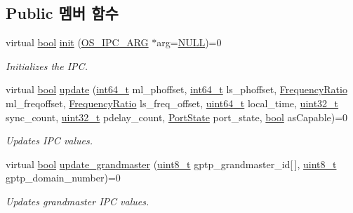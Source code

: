 \subsection*{Public 멤버 함수}
\begin{DoxyCompactItemize}
\item 
virtual \hyperlink{avb__gptp_8h_af6a258d8f3ee5206d682d799316314b1}{bool} \hyperlink{class_o_s___i_p_c_af0461840a5fc47851aa77477baf10f6b}{init} (\hyperlink{class_o_s___i_p_c___a_r_g}{O\+S\+\_\+\+I\+P\+C\+\_\+\+A\+RG} $\ast$arg=\hyperlink{openavb__types__base__pub_8h_a070d2ce7b6bb7e5c05602aa8c308d0c4}{N\+U\+LL})=0
\begin{DoxyCompactList}\small\item\em Initializes the I\+PC. \end{DoxyCompactList}\item 
virtual \hyperlink{avb__gptp_8h_af6a258d8f3ee5206d682d799316314b1}{bool} \hyperlink{class_o_s___i_p_c_a33745dd660255c4161278e3bf75387dc}{update} (\hyperlink{parse_8c_a67a9885ef4908cb72ce26d75b694386c}{int64\+\_\+t} ml\+\_\+phoffset, \hyperlink{parse_8c_a67a9885ef4908cb72ce26d75b694386c}{int64\+\_\+t} ls\+\_\+phoffset, \hyperlink{ptptypes_8hpp_a84de47dc2ed889ecd2b61706d3ad0f2e}{Frequency\+Ratio} ml\+\_\+freqoffset, \hyperlink{ptptypes_8hpp_a84de47dc2ed889ecd2b61706d3ad0f2e}{Frequency\+Ratio} ls\+\_\+freq\+\_\+offset, \hyperlink{parse_8c_aec6fcb673ff035718c238c8c9d544c47}{uint64\+\_\+t} local\+\_\+time, \hyperlink{parse_8c_a6eb1e68cc391dd753bc8ce896dbb8315}{uint32\+\_\+t} sync\+\_\+count, \hyperlink{parse_8c_a6eb1e68cc391dd753bc8ce896dbb8315}{uint32\+\_\+t} pdelay\+\_\+count, \hyperlink{ptptypes_8hpp_a679431f1afc75d7bb9e972c022e53672}{Port\+State} port\+\_\+state, \hyperlink{avb__gptp_8h_af6a258d8f3ee5206d682d799316314b1}{bool} as\+Capable)=0
\begin{DoxyCompactList}\small\item\em Updates I\+PC values. \end{DoxyCompactList}\item 
virtual \hyperlink{avb__gptp_8h_af6a258d8f3ee5206d682d799316314b1}{bool} \hyperlink{class_o_s___i_p_c_a322c3dc7306144448f366a525f634fdf}{update\+\_\+grandmaster} (\hyperlink{stdint_8h_aba7bc1797add20fe3efdf37ced1182c5}{uint8\+\_\+t} gptp\+\_\+grandmaster\+\_\+id\mbox{[}$\,$\mbox{]}, \hyperlink{stdint_8h_aba7bc1797add20fe3efdf37ced1182c5}{uint8\+\_\+t} gptp\+\_\+domain\+\_\+number)=0
\begin{DoxyCompactList}\small\item\em Updates grandmaster I\+PC values. \end{DoxyCompactList}\item 

\end{DoxyCompactItemize}
